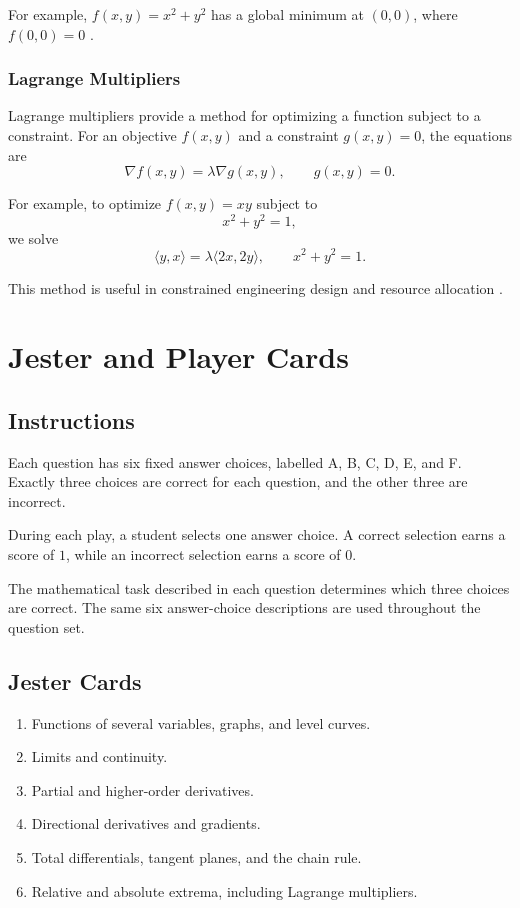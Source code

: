 \documentclass[a4paper,12pt]{article}
\theoremstyle{mystyle}
\numberwithin{equation}{section}
\numberwithin{theorem}{section}
\numberwithin{proposition}{section}
\numberwithin{example}{section}
\numberwithin{remark}{section}
\numberwithin{lemma}{section}
\numberwithin{corollary}{section}
\numberwithin{definition}{section}
\begin{document}
For example, $f(x,y)=x^2+y^2$ has a global minimum
at $(0,0)$, where $f(0,0)=0$
\cite{openstaxmaxima}.

\subsubsection{Lagrange Multipliers}

Lagrange multipliers provide a method for optimizing
a function subject to a constraint. For an objective
$f(x,y)$ and a constraint $g(x,y)=0$, the equations
are
\[
\nabla f(x,y)=\lambda\nabla g(x,y),
\qquad g(x,y)=0.
\]

For example, to optimize $f(x,y)=xy$ subject to
\[
x^2+y^2=1,
\]
we solve
\[
\langle y,x\rangle
=\lambda\langle 2x,2y\rangle,
\qquad x^2+y^2=1.
\]

This method is useful in constrained engineering
design and resource allocation
\cite{openstaxlagrange}.
\section{Jester and Player Cards}
\label{S:3}
\subsection{Instructions}

Each question has six fixed answer choices, labelled
A, B, C, D, E, and F. Exactly three choices are correct
for each question, and the other three are incorrect.

During each play, a student selects one answer choice.
A correct selection earns a score of $1$, while an
incorrect selection earns a score of $0$.

The mathematical task described in each question
determines which three choices are correct. The same
six answer-choice descriptions are used throughout
the question set.

\subsection{Jester Cards}

\begin{enumerate}[label=\Alph*.]
  \item Functions of several variables, graphs, and
  level curves.
  \item Limits and continuity.
  \item Partial and higher-order derivatives.
  \item Directional derivatives and gradients.
  \item Total differentials, tangent planes, and
  the chain rule.
  \item Relative and absolute extrema, including
  Lagrange multipliers.
\end{enumerate}
\end{document}
